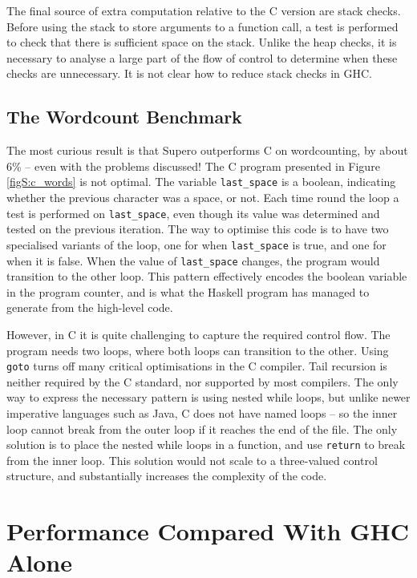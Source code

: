 The final source of extra computation relative to the C version are stack checks. Before using the stack to store arguments to a function call, a test is performed to check that there is sufficient space on the stack. Unlike the heap checks, it is necessary to analyse a large part of the flow of control to determine when these checks are unnecessary. It is not clear how to reduce stack checks in GHC.

\subsection{The Wordcount Benchmark}

The most curious result is that Supero outperforms C on wordcounting, by about 6\% -- even with the problems discussed! The C program presented in Figure \ref{figS:c_words} is not optimal. The variable \verb"last_space" is a boolean, indicating whether the previous character was a space, or not. Each time round the loop a test is performed on \verb"last_space", even though its value was determined and tested on the previous iteration. The way to optimise this code is to have two specialised variants of the loop, one for when \verb"last_space" is true, and one for when it is false. When the value of \verb"last_space" changes, the program would transition to the other loop. This pattern effectively encodes the boolean variable in the program counter, and is what the Haskell program has managed to generate from the high-level code.

However, in C it is quite challenging to capture the required control flow. The program needs two loops, where both loops can transition to the other. Using \texttt{goto} turns off many critical optimisations in the C compiler. Tail recursion is neither required by the C standard, nor supported by most compilers. The only way to express the necessary pattern is using nested while loops, but unlike newer imperative languages such as Java, C does not have named loops -- so the inner loop cannot break from the outer loop if it reaches the end of the file. The only solution is to place the nested while loops in a function, and use \texttt{return} to break from the inner loop. This solution would not scale to a three-valued control structure, and substantially increases the complexity of the code.

\section{Performance Compared With GHC Alone}
\label{secS:haskell_results}


